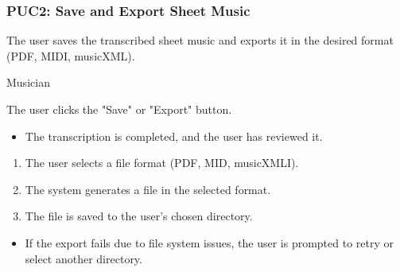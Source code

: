 \documentclass[12pt]{article}
\begin{document}
\subsubsection*{PUC2: Save and Export Sheet Music}
\begin{description}[style=nextline]
    \item[Description:] The user saves the transcribed sheet music and exports it in the desired format (PDF, MIDI, musicXML).
    \item[Primary Actor:] Musician
    \item[Trigger:] The user clicks the "Save" or "Export" button.
    \item[Preconditions:]
    \begin{itemize}
        \item The transcription is completed, and the user has reviewed it.
    \end{itemize}
    \item[Main Success Scenario:]
    \begin{enumerate}
        \item The user selects a file format (PDF, MID, musicXMLI).
        \item The system generates a file in the selected format.
        \item The file is saved to the user’s chosen directory.
    \end{enumerate}
    \item[Exceptions:]
    \begin{itemize}
        \item If the export fails due to file system issues, the user is prompted to retry or select another directory.
    \end{itemize}
\end{description}
\end{document}
